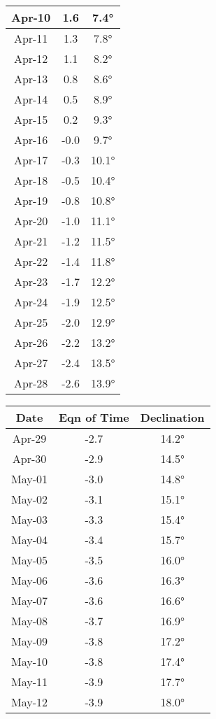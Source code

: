 \begin{footnotesize}
\begin{minipage}{0.33\textwidth}
\begin{tabular}[t]{c | c | c }
Apr-10 & 1.6 & 7.4°\\\hline
Apr-11 & 1.3 & 7.8°\\\hline
Apr-12 & 1.1 & 8.2°\\\hline
Apr-13 & 0.8 & 8.6°\\\hline
Apr-14 & 0.5 & 8.9°\\\hline
Apr-15 & 0.2 & 9.3°\\\hline
Apr-16 & -0.0 & 9.7°\\\hline
Apr-17 & -0.3 & 10.1°\\\hline
Apr-18 & -0.5 & 10.4°\\\hline
Apr-19 & -0.8 & 10.8°\\\hline
Apr-20 & -1.0 & 11.1°\\\hline
Apr-21 & -1.2 & 11.5°\\\hline
Apr-22 & -1.4 & 11.8°\\\hline
Apr-23 & -1.7 & 12.2°\\\hline
Apr-24 & -1.9 & 12.5°\\\hline
Apr-25 & -2.0 & 12.9°\\\hline
Apr-26 & -2.2 & 13.2°\\\hline
Apr-27 & -2.4 & 13.5°\\\hline
Apr-28 & -2.6 & 13.9°\\\hline
\end{tabular}\end{minipage}
\begin{minipage}{0.33\textwidth}
\begin{tabular}[t]{c | c | c}
Date&Eqn of Time&Declination\\\hline
Apr-29 & -2.7 & 14.2°\\\hline
Apr-30 & -2.9 & 14.5°\\\hline
May-01 & -3.0 & 14.8°\\\hline
May-02 & -3.1 & 15.1°\\\hline
May-03 & -3.3 & 15.4°\\\hline
May-04 & -3.4 & 15.7°\\\hline
May-05 & -3.5 & 16.0°\\\hline
May-06 & -3.6 & 16.3°\\\hline
May-07 & -3.6 & 16.6°\\\hline
May-08 & -3.7 & 16.9°\\\hline
May-09 & -3.8 & 17.2°\\\hline
May-10 & -3.8 & 17.4°\\\hline
May-11 & -3.9 & 17.7°\\\hline
May-12 & -3.9 & 18.0°\\\hline

\end{tabular}
\end{minipage}
\end{footnotesize}
